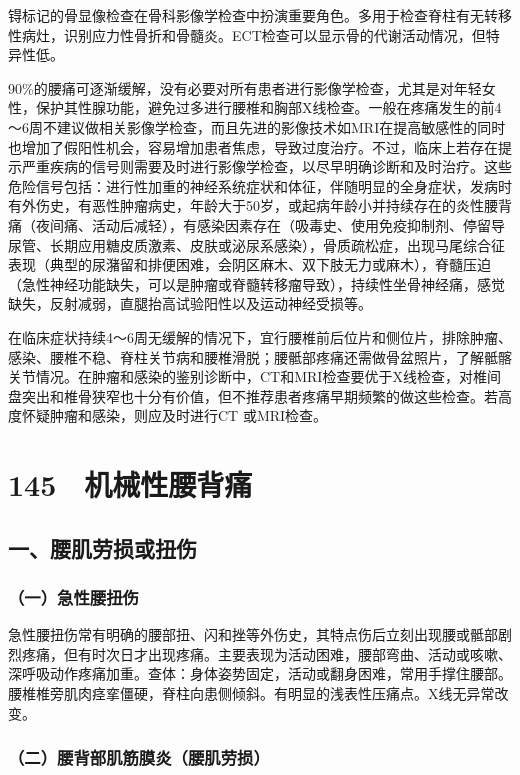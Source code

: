 锝标记的骨显像检查在骨科影像学检查中扮演重要角色。多用于检查脊柱有无转移性病灶，识别应力性骨折和骨髓炎。ECT检查可以显示骨的代谢活动情况，但特异性低。

90\%的腰痛可逐渐缓解，没有必要对所有患者进行影像学检查，尤其是对年轻女性，保护其性腺功能，避免过多进行腰椎和胸部X线检查。一般在疼痛发生的前4～6周不建议做相关影像学检查，而且先进的影像技术如MRI在提高敏感性的同时也增加了假阳性机会，容易增加患者焦虑，导致过度治疗。不过，临床上若存在提示严重疾病的信号则需要及时进行影像学检查，以尽早明确诊断和及时治疗。这些危险信号包括：进行性加重的神经系统症状和体征，伴随明显的全身症状，发病时有外伤史，有恶性肿瘤病史，年龄大于50岁，或起病年龄小并持续存在的炎性腰背痛（夜间痛、活动后减轻），有感染因素存在（吸毒史、使用免疫抑制剂、停留导尿管、长期应用糖皮质激素、皮肤或泌尿系感染），骨质疏松症，出现马尾综合征表现（典型的尿潴留和排便困难，会阴区麻木、双下肢无力或麻木），脊髓压迫（急性神经功能缺失，可以是肿瘤或脊髓转移瘤导致），持续性坐骨神经痛，感觉缺失，反射减弱，直腿抬高试验阳性以及运动神经受损等。

在临床症状持续4～6周无缓解的情况下，宜行腰椎前后位片和侧位片，排除肿瘤、感染、腰椎不稳、脊柱关节病和腰椎滑脱；腰骶部疼痛还需做骨盆照片，了解骶髂关节情况。在肿瘤和感染的鉴别诊断中，CT和MRI检查要优于X线检查，对椎间盘突出和椎骨狭窄也十分有价值，但不推荐患者疼痛早期频繁的做这些检查。若高度怀疑肿瘤和感染，则应及时进行CT
或MRI检查。

\protect\hypertarget{text00333.html}{}{}

\section{145　机械性腰背痛}

\subsection{一、腰肌劳损或扭伤}

\subsubsection{（一）急性腰扭伤}

急性腰扭伤常有明确的腰部扭、闪和挫等外伤史，其特点伤后立刻出现腰或骶部剧烈疼痛，但有时次日才出现疼痛。主要表现为活动困难，腰部弯曲、活动或咳嗽、深呼吸动作疼痛加重。查体：身体姿势固定，活动或翻身困难，常用手撑住腰部。腰椎椎旁肌肉痉挛僵硬，脊柱向患侧倾斜。有明显的浅表性压痛点。X线无异常改变。

\subsubsection{（二）腰背部肌筋膜炎（腰肌劳损）}

